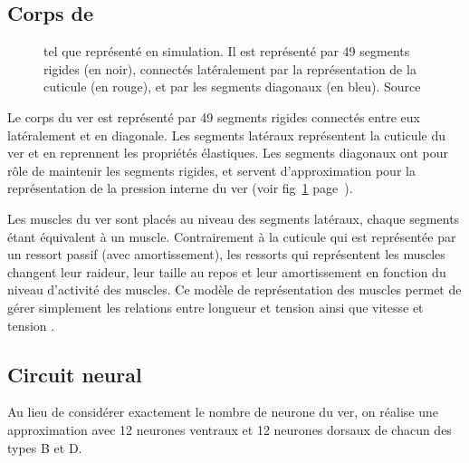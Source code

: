 \subsection{Corps de \celeg{}} %
\label{sub:Corps de celeg}

\begin{figure}[ht]
   \begin{center}
   \end{center}
   \caption[Représentation de \celeg{} en simulation]{\celeg{} tel que représenté en simulation. Il est représenté
   par 49 segments rigides (en noir), connectés latéralement par la représentation
   de la cuticule (en rouge), et par les segments diagonaux (en bleu). Source
   \cite{Boyle2009}}
   \label{fig:celegans_representation}
\end{figure}

Le corps du ver est représenté par 49 segments rigides connectés entre eux
latéralement et en diagonale. Les segments latéraux représentent la cuticule du
ver et en reprennent les propriétés élastiques. Les segments diagonaux ont pour
rôle de maintenir les segments rigides, et servent d'approximation pour la
représentation de la pression interne du ver (voir
fig~\ref{fig:celegans_representation}
page~\pageref{fig:celegans_representation}).

Les muscles du ver sont placés au niveau des segments latéraux, chaque segments
étant équivalent à un muscle. Contrairement à la cuticule qui est représentée par un
ressort passif (avec amortissement), les ressorts qui représentent les muscles
changent leur raideur, leur taille au repos et leur amortissement en fonction du niveau
d'activité des muscles. Ce modèle de représentation des muscles permet de gérer
simplement les relations entre longueur et tension ainsi que vitesse et tension
\cite{Boyle2009}.


\subsection{Circuit neural} %
\label{sub:Circuit neural}

Au lieu de considérer exactement le nombre de neurone du ver, on réalise une
approximation avec 12 neurones ventraux et 12 neurones dorsaux de chacun des types
B et D.

